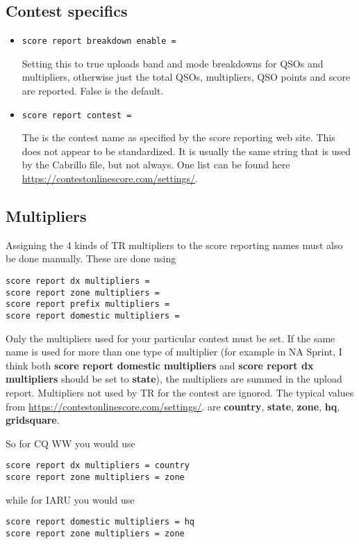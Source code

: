 \documentclass[12pt]{article}
\begin{document}
\subsection{Contest specifics}
\begin{itemize}
\item
\begin{verbatim}
score report breakdown enable =
\end{verbatim}
Setting this to true uploads band and mode breakdowns for QSOs and multipliers,
otherwise just the total QSOs, multipliers,  QSO points and score are reported.
False is the default.
\item
\begin{verbatim}
score report contest =
\end{verbatim}
The is the contest name as specified by the score reporting web site.
This does not appear to be standardized. It is usually the same string
that is used by the Cabrillo file, but not always.
One list can be found here \url{https://contestonlinescore.com/settings/}.
\end{itemize}


\subsection{Multipliers}
Assigning the 4 kinds of TR multipliers to the score reporting names must
also be done manually. These are done using
\begin{verbatim}
score report dx multipliers =
score report zone multipliers =
score report prefix multipliers =
score report domestic multipliers =
\end{verbatim}

Only the multipliers used for your particular
contest must be set. If the same name is used for more than
one type of multiplier (for example
in NA Sprint, I think both {\bf score report domestic multipliers} and
{\bf  score report dx multipliers} should be set to {\bf state}), the
multipliers are summed in the upload report.
Multipliers not used by TR for the contest are ignored. The typical values
from \url{https://contestonlinescore.com/settings/}.
are {\bf country}, {\bf state}, {\bf zone}, {\bf hq}, {\bf gridsquare}.

So for CQ WW you would use
\begin{verbatim}
score report dx multipliers = country
score report zone multipliers = zone
\end{verbatim}
while for IARU you would use
\begin{verbatim}
score report domestic multipliers = hq
score report zone multipliers = zone
\end{verbatim}
\end{document}
